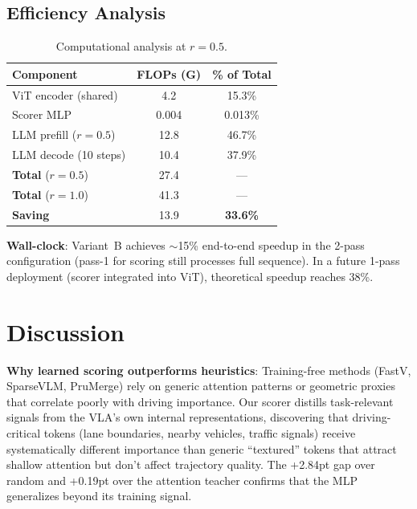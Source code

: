 \documentclass[letterpaper]{article} %
\begin{document}
\subsection{Efficiency Analysis}

\begin{table}[t]
\centering
\caption{Computational analysis at $r{=}0.5$.}
\label{tab:efficiency}
\small
\begin{tabular}{lcc}
\toprule
\textbf{Component} & \textbf{FLOPs (G)} & \textbf{\% of Total} \\
\midrule
ViT encoder (shared) & 4.2 & 15.3\% \\
Scorer MLP & 0.004 & 0.013\% \\
LLM prefill ($r{=}0.5$) & 12.8 & 46.7\% \\
LLM decode (10 steps) & 10.4 & 37.9\% \\
\midrule
\textbf{Total} ($r{=}0.5$) & 27.4 & --- \\
\textbf{Total} ($r{=}1.0$) & 41.3 & --- \\
\textbf{Saving} & 13.9 & \textbf{33.6\%} \\
\bottomrule
\end{tabular}
\end{table}

\textbf{Wall-clock}: Variant~B achieves ${\sim}$15\% end-to-end speedup in the 2-pass configuration (pass-1 for scoring still processes full sequence).
In a future 1-pass deployment (scorer integrated into ViT), theoretical speedup reaches 38\%.

\section{Discussion}
\label{sec:discussion}

\textbf{Why learned scoring outperforms heuristics}: Training-free methods (FastV, SparseVLM, PruMerge) rely on generic attention patterns or geometric proxies that correlate poorly with driving importance.
Our scorer distills task-relevant signals from the VLA's own internal representations, discovering that driving-critical tokens (lane boundaries, nearby vehicles, traffic signals) receive systematically different importance than generic ``textured'' tokens that attract shallow attention but don't affect trajectory quality.
The +2.84pt gap over random and +0.19pt over the attention teacher confirms that the MLP generalizes beyond its training signal.
\end{document}
